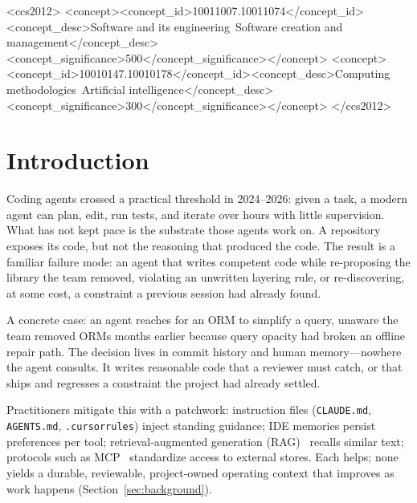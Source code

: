 \documentclass[sigconf,nonacm]{acmart}
\begin{document}
\begin{CCSXML}
<ccs2012>
<concept><concept_id>10011007.10011074</concept_id><concept_desc>Software and its engineering~Software creation and management</concept_desc><concept_significance>500</concept_significance></concept>
<concept><concept_id>10010147.10010178</concept_id><concept_desc>Computing methodologies~Artificial intelligence</concept_desc><concept_significance>300</concept_significance></concept>
</ccs2012>
\end{CCSXML}

\maketitle

\section{Introduction}
Coding agents crossed a practical threshold in 2024--2026: given a task, a modern
agent can plan, edit, run tests, and iterate over hours with little supervision.
What has not kept pace is the substrate those agents work on. A repository exposes
its code, but not the reasoning that produced the code. The result is a familiar
failure mode: an agent that writes competent code while re-proposing the library
the team removed, violating an unwritten layering rule, or re-discovering, at some
cost, a constraint a previous session had already found.

A concrete case: an agent reaches for an ORM to simplify a query, unaware the team
removed ORMs months earlier because query opacity had broken an offline repair
path. The decision lives in commit history and human memory---nowhere the agent
consults. It writes reasonable code that a reviewer must catch, or that ships and
regresses a constraint the project had already settled.

Practitioners mitigate this with a patchwork: instruction files
(\texttt{CLAUDE.md}, \texttt{AGENTS.md}, \texttt{.cursorrules}) inject standing
guidance; IDE memories persist preferences per tool; retrieval-augmented
generation (RAG)~\cite{lewis2020rag} recalls similar text; protocols such as
MCP~\cite{mcp2024} standardize access to external stores. Each helps; none yields
a durable, reviewable, project-owned operating context that improves as work
happens (Section~\ref{sec:background}).
\end{document}
